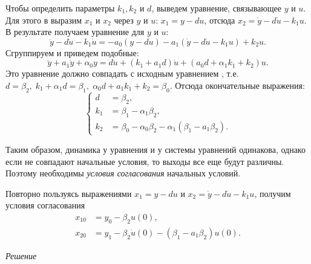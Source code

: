 \documentclass[../../TAU.tex]{subfiles}
\begin{document}
    Чтобы определить параметры $k_1,k_2$ и $d$, выведем уравнение, связывающее $y$ и $u$. Для этого в  выразим $x_1$ и $x_2$ через $y$ и $u$:
    ${x_1 = y - du}$, 
    отсюда 
    ${x_2 = \dot y - d\dot u -k_1 u}$. 
    В результате получаем уравнение для $y$ и $u$:
    $$
        \ddot y - d \ddot u -k_1\dot u = -a_0 (y-du)-a_1(\dot y - d \dot u - k_1 u)+k_2u.
    $$
    Сгруппируем и приведем подобные:
    $$
        \ddot y +a_1\dot y + \alpha_0 y = d\ddot u + (k_1+a_1d)\dot u + (a_0 d + \alpha_1k_1+k_2)u.
    $$
    Это уравнение должно совпадать с исходным уравнением , т.е.
    ${d = \beta_2,\; k_1 + \alpha_1d = \beta_1,\; \alpha_0 d+a_1k_1+k_2 = \beta_0}$. 
    Отсюда окончательные выражения:
    $$
        \left\{
        \begin{aligned}
            d&=\beta_2,\\
            k_1 &= \beta_1 - \alpha_1\beta_2,\\
            k_2 &= \beta_0 - \alpha_0 \beta_2 - \alpha_1 (\beta_1-a_1\beta_2).
        \end{aligned}
        \right.
    $$

    Таким образом, динамика у уравнения  и у системы уравнений  одинакова, однако если не совпадают начальные условия, то выходы все еще будут различны. Поэтому необходимы {\it условия согласования} начальных условий.

    Повторно пользуясь выражениями 
    ${x_1 = y - du}$ 
    и 
    ${x_2 = \dot y - d\dot u -k_1 u}$, 
    получим условия согласования
    $$
        \begin{aligned}
            x_{10} &= y_0- \beta_2 u(0),\\
            x_{20} &= y_1-\beta_2\dot u (0) - (\beta_1-a_1\beta_2)u(0).
        \end{aligned}
    $$

    \textit{Решение}
    
\end{document}
